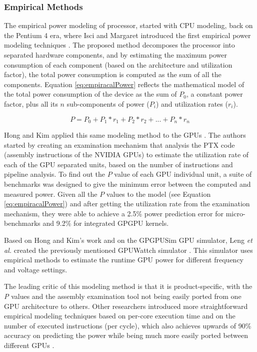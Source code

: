 \subsubsection{Empirical Methods}
\label{subsubsection:EmpiricalMethods}
The empirical power modeling of processor, started with CPU modeling, back on the Pentium 4 era, where Isci and Margaret introduced the first empirical power modeling techniques \cite{isci_runtime_2003}. The proposed method decomposes the processor into separated hardware components, and by estimating the maximum power consumption of each component (based on the architecture and utilization factor), the total power consumption is computed as the sum of all the components. Equation \ref{eq:empiracalPower} reflects the mathematical model of the total power consumption of the device as the sum of $P_0$, a constant power factor, plus all its $n$ sub-components of power ($P_i$) and utilization rates ($r_i$). 

\begin{equation}
\label{eq:empiracalPower}
    P = P_0 + P_1 * r_1 +  P_2 * r_2 + ... + P_n * r_n
\end{equation}

Hong and Kim applied this same modeling method to the GPUs \cite{hong_integrated_2010}. The authors started by creating an examination mechanism that analysis the PTX code (assembly instructions of the NVIDIA GPUs) to estimate the utilization rate of each of the GPU separated units, based on the number of instructions and pipeline analysis. To find out the $P$ value of each GPU individual unit, a suite of benchmarks was designed to give the minimum error between the computed and measured power. Given all the $P$ values to the model (see Equation \ref{eq:empiracalPower}) and after getting the utilization rate from the examination mechanism, they were able to achieve a 2.5\% power prediction error for micro-benchmarks and 9.2\% for integrated GPGPU kernels.

Based on Hong and Kim's work and on the GPGPUSim GPU simulator, Leng \textit{et al.} created the previously mentioned GPUWattch simulator \cite{noauthor_gpu_2011} \cite{leng_gpuwattch:_2013}. This simulator uses empirical methods to estimate the runtime GPU power for different frequency and voltage settings. 

The leading critic of this modeling method is that it is product-specific, with the \textit{P} values and the assembly examination tool not being easily ported from one GPU architecture to others. Other researchers introduced more straightforward empirical modeling techniques based on per-core execution time and on the number of executed instructions (per cycle), which also achieves upwards of 90\% accuracy on predicting the power while being much more easily ported between different GPUs \cite{mei_survey_2016}.

